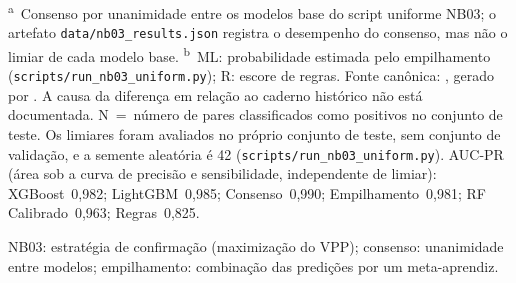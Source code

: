 \begin{table}[htbp]
\vspace{4pt}
\footnotesize
\textsuperscript{a}~Consenso por unanimidade entre os modelos base do script uniforme NB03; o artefato \texttt{data/nb03\_results.json} registra o desempenho do consenso, mas não o limiar de cada modelo base.
\textsuperscript{b}~ML: probabilidade estimada pelo empilhamento (\texttt{scripts/run\_nb03\_uniform.py}); R: escore de regras.
Fonte canônica: , gerado por . A causa da diferença em relação ao caderno histórico não está documentada. N~=~número de pares classificados como positivos no conjunto de teste. Os limiares foram avaliados no próprio conjunto de teste, sem conjunto de validação, e a semente aleatória é 42 (\texttt{scripts/run\_nb03\_uniform.py}).
AUC-PR (área sob a curva de precisão e sensibilidade, independente de limiar): XGBoost~0,982; LightGBM~0,985; Consenso~0,990; Empilhamento~0,981; RF Calibrado~0,963; Regras~0,825.
\par\footnotesize NB03: estratégia de confirmação (maximização do VPP); consenso: unanimidade entre modelos; empilhamento: combinação das predições por um meta-aprendiz.
\end{table}
